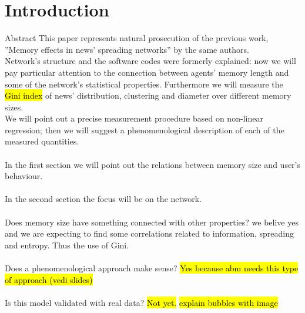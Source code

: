\section{Introduction}
Abstract
This paper represents natural prosecution of the previous work,
''Memory effects in news' spreading networks'' by the same authors.\\
Network's structure and the software codes were
formerly explained: now we will pay particular attention to
the connection between agents' memory length  and some of the
network's statistical properties.
Furthermore we will measure the \hl{Gini index} of news' distribution,
clustering and diameter over different memory sizes.\\
We will point out a precise measurement procedure based on non-linear
regression; then we will suggest a phenomenological description of
each of the measured quantities.\\ \\
In the first section we will point out the relations between memory size
and user's behaviour. \\ \\
In the second section the focus will be on the network.\\ \\
Does memory size have something connected with other properties?
we belive yes and we are expecting to find some correlations related
to information, spreading and entropy. Thus the use of Gini.\\ \\
Does a phenomenological approach make sense? \hl{Yes because abm needs
this type of approach (vedi slides)}\\ \\
Is this model validated with real data? \hl{Not yet.}
\hl{explain bubbles with image}